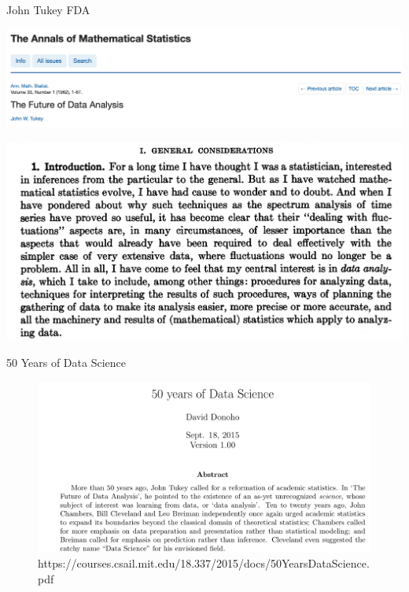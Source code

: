 \documentclass[
  ignorenonframetext,
]{beamer}
\begin{document}
\begin{frame}{John Tukey FDA}
\protect\hypertarget{john-tukey-fda}{}
\begin{center}\includegraphics[width=0.7\linewidth]{figures/tukey1} \end{center}

\begin{center}\includegraphics[width=0.7\linewidth]{figures/tukey2} \end{center}
\end{frame}

\begin{frame}{50 Years of Data Science}
\protect\hypertarget{years-of-data-science}{}
\begin{figure}

{\centering \includegraphics[width=0.7\linewidth]{figures/donoho} 

}

\caption{https://courses.csail.mit.edu/18.337/2015/docs/50YearsDataScience.pdf}\label{fig:unnamed-chunk-16}
\end{figure}
\end{frame}
\end{document}

